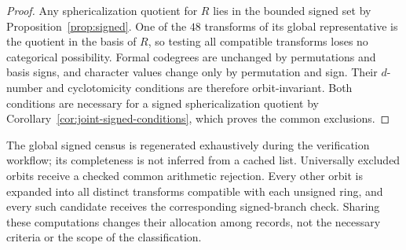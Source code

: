 \begin{proof}
Any sphericalization quotient for $R$ lies in the bounded signed
set by Proposition~\ref{prop:signed}. One of the $48$ transforms
of its global representative is the quotient in the basis of $R$,
so testing all compatible transforms loses no categorical
possibility. Formal codegrees are unchanged by permutations and
basis signs, and character values change only by permutation and
sign. Their $d$-number and cyclotomicity conditions are therefore
orbit-invariant. Both conditions are necessary for a signed
sphericalization quotient by Corollary~\ref{cor:joint-signed-conditions},
which proves the common exclusions.
\end{proof}

\begin{remark}
The global signed census is regenerated exhaustively during the
verification workflow; its completeness is not inferred from a
cached list. Universally excluded orbits receive a checked common
arithmetic rejection. Every other orbit is expanded into all
distinct transforms compatible with each unsigned ring, and every
such candidate receives the corresponding signed-branch check.
Sharing these computations changes their allocation among records,
not the necessary criteria or the scope of the classification.
\end{remark}
